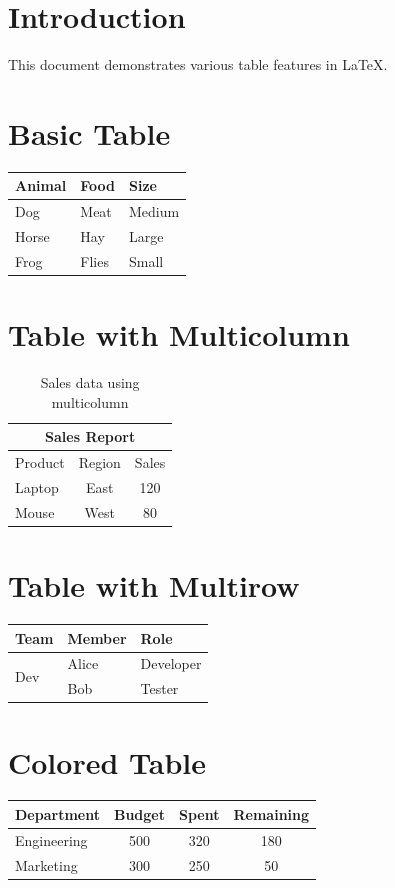 ﻿\documentclass[12pt, a4paper]{article}
\begin{document}
\tableofcontents

\section{Introduction}
This document demonstrates various table features in \LaTeX{}.

\section{Basic Table}

\begin{tabular}{|l|l|l|}
\hline
Animal & Food & Size \\
\hline
Dog & Meat & Medium \\
Horse & Hay & Large \\
Frog & Flies & Small \\
\hline
\end{tabular}

\section{Table with Multicolumn}

\begin{table}[h]
\centering
\begin{tabular}{|l|c|c|}
\hline
\multicolumn{3}{|c|}{Sales Report} \\
\hline
Product & Region & Sales \\
\hline
Laptop & East & 120 \\
Mouse & West & 80 \\
\hline
\end{tabular}
\caption{Sales data using multicolumn}
\end{table}

\section{Table with Multirow}

\begin{tabular}{|l|l|l|}
\hline
Team & Member & Role \\
\hline
\multirow{2}{*}{Dev} & Alice & Developer \\
 & Bob & Tester \\
\hline
\end{tabular}

\section{Colored Table}

\begin{tabular}{|l|c|c|c|}
\hline
\rowcolor{gray!30} Department & Budget & Spent & Remaining \\
\hline
Engineering & 500 & 320 & 180 \\
\rowcolor{yellow!20} Marketing & 300 & 250 & 50 \\
\hline
\end{tabular}
\end{document}
